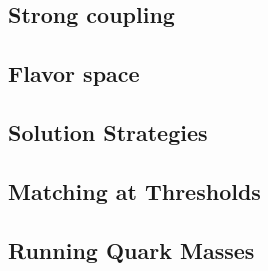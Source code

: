 \subsection{Strong coupling}
\label{sec:theory:coupling}


\subsection{Flavor space}
\label{sec:theory:flavor}


\subsection{Solution Strategies}
\label{sec:theory:solutions}


\subsection{Matching at Thresholds}
\label{sec:theory:matching}


\subsection{Running Quark Masses}
\label{sec:theory:msbarmass}

